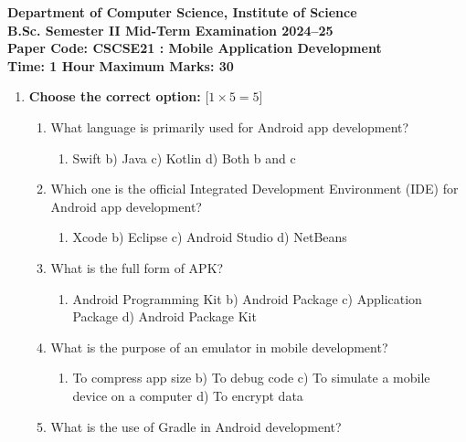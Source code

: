 \documentclass[11pt,a4paper]{article}
\begin{document}
\begin{center}
    {\Large   \textbf{Department of Computer Science, Institute of Science}}\\[4pt]
    {\large   \textbf{B.Sc. Semester II Mid-Term Examination 2024--25}}\\[4pt]
   \textbf{Paper Code: CSCSE21 : Mobile Application Development}\\[6pt]
   \textbf{Time: 1 Hour} \hfill   \textbf{Maximum Marks: 30}
\end{center}
\hr


\begin{enumerate}[label=   \textbf{Q\arabic*.}]
    \item   \textbf{Choose the correct option:} \hfill [$1  \times 5 = 5$]
    
\begin{enumerate}[label=\arabic*.]
        \item What language is primarily used for Android app development?
        
\begin{enumerate}[label=\alph*)]
            \item Swift \quad b) Java \quad c) Kotlin \quad d) Both b and c
        \end{enumerate}
        \item Which one is the official Integrated Development Environment (IDE) for Android app development?
        
\begin{enumerate}[label=\alph*)]
            \item Xcode \quad b) Eclipse \quad c) Android Studio \quad d) NetBeans
        \end{enumerate}
        \item What is the full form of APK?
        
\begin{enumerate}[label=\alph*)]
            \item Android Programming Kit \quad b) Android Package \quad c) Application Package \quad d) Android Package Kit
        \end{enumerate}
        \item What is the purpose of an emulator in mobile development?
        
\begin{enumerate}[label=\alph*)]
            \item To compress app size \quad b) To debug code \quad c) To simulate a mobile device on a computer \quad d) To encrypt data
        \end{enumerate}
        \item What is the use of Gradle in Android development?
        

\end{enumerate}
\end{enumerate}
\end{document}
